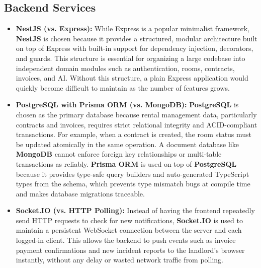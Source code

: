 \subsection{Backend Services}
\begin{itemize}
    \item \textbf{NestJS (vs. Express):} While Express is a popular minimalist framework, \textbf{NestJS} is chosen because it provides a structured, modular architecture built on top of Express with built-in support for dependency injection, decorators, and guards. This structure is essential for organizing a large codebase into independent domain modules such as authentication, rooms, contracts, invoices, and AI. Without this structure, a plain Express application would quickly become difficult to maintain as the number of features grows.

    \item \textbf{PostgreSQL with Prisma ORM (vs. MongoDB):} \textbf{PostgreSQL} is chosen as the primary database because rental management data, particularly contracts and invoices, requires strict relational integrity and ACID-compliant transactions. For example, when a contract is created, the room status must be updated atomically in the same operation. A document database like \textbf{MongoDB} cannot enforce foreign key relationships or multi-table transactions as reliably. \textbf{Prisma ORM} is used on top of \textbf{PostgreSQL} because it provides type-safe query builders and auto-generated TypeScript types from the schema, which prevents type mismatch bugs at compile time and makes database migrations traceable.

    \item \textbf{Socket.IO (vs. HTTP Polling):} Instead of having the frontend repeatedly send HTTP requests to check for new notifications, \textbf{Socket.IO} is used to maintain a persistent WebSocket connection between the server and each logged-in client. This allows the backend to push events such as invoice payment confirmations and new incident reports to the landlord's browser instantly, without any delay or wasted network traffic from polling.
\end{itemize}

